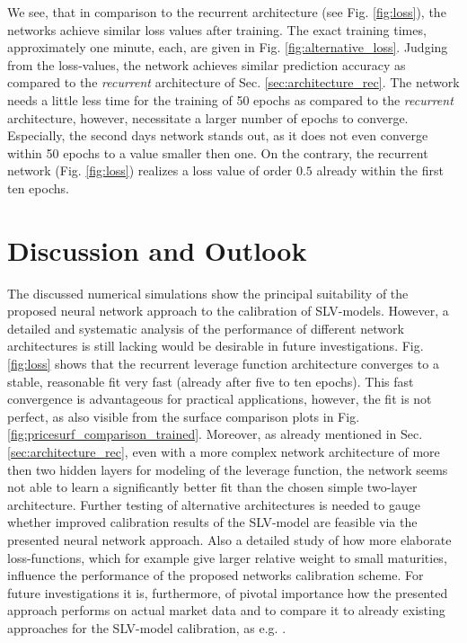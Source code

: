 \documentclass[
a4paper,     %
12pt           %
]{scrartcl}  %
\numberwithin{equation}{section}
\begin{document}
We see, that in comparison to the recurrent architecture (see Fig. \ref{fig:loss}), the networks achieve similar loss values after training. The exact training times, approximately one minute, each, are given in Fig. \ref{fig:alternative_loss}. Judging from the loss-values, the network achieves similar prediction accuracy as compared to the \textit{recurrent} architecture of Sec. \ref{sec:architecture_rec}. The network needs a little less time for the training of 50 epochs as compared to the \textit{recurrent} architecture, however, necessitate a larger number of epochs to converge. Especially, the second days network stands out, as it does not even converge within 50 epochs to a value smaller then one. On the contrary, the recurrent network (Fig. \ref{fig:loss}) realizes a loss value of order $0.5$ already within the first ten epochs.



\section{Discussion and Outlook}

The discussed numerical simulations show the principal suitability of the proposed neural network approach to the calibration of SLV-models. However, a detailed and systematic analysis of the performance of different network architectures is still lacking would be desirable in future investigations. Fig. \ref{fig:loss} shows that the recurrent leverage function architecture converges to a stable, reasonable fit very fast (already after five to ten epochs). This fast convergence is advantageous for practical applications, however, the fit is not perfect, as also visible from the surface comparison plots in Fig. \ref{fig:pricesurf_comparison_trained}. Moreover, as already mentioned in Sec. \ref{sec:architecture_rec}, even with a more complex network architecture of more then two hidden layers for modeling of the leverage function, the network seems not able to learn a significantly better fit than the chosen simple two-layer architecture. Further testing of alternative architectures is needed to gauge whether improved calibration results of the SLV-model are feasible via the presented neural network approach. Also a detailed study of how more elaborate loss-functions, which for example give larger relative weight to small maturities, influence the performance of the proposed networks calibration scheme. For future investigations it is, furthermore, of pivotal importance how the presented approach performs on actual market data and to compare it to already existing approaches for the SLV-model calibration, as e.g. \cite{cozma_calibration_2019,guo_calibration_2019,saporito_calibration_2017}.
\end{document}
